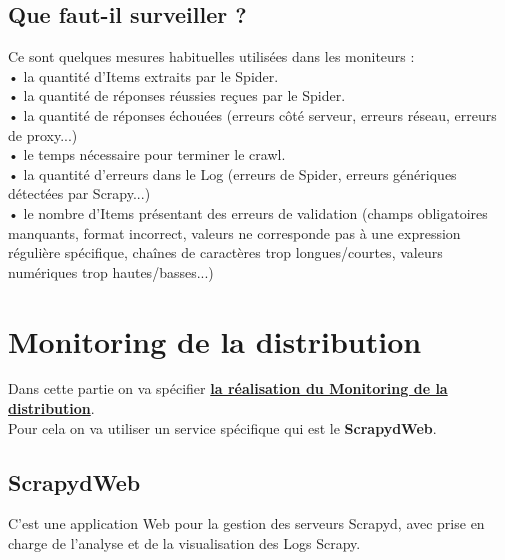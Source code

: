 \subsection{Que faut-il surveiller ?}
\noindent Ce sont quelques mesures habituelles utilisées dans les moniteurs :\\
\indent• la quantité d'Items extraits par le Spider.\\
\indent• la quantité de réponses réussies reçues par le Spider.\\
\indent• la quantité de réponses échouées (erreurs côté serveur, erreurs réseau, erreurs de proxy...)\\
\indent• le temps nécessaire pour terminer le crawl.\\
\indent• la quantité d'erreurs dans le Log (erreurs de Spider, erreurs génériques détectées par Scrapy...)\\
\indent• le nombre d'Items présentant des erreurs de validation (champs obligatoires manquants, format incorrect, valeurs ne corresponde pas à une expression régulière spécifique, chaînes de caractères trop longues/courtes, valeurs numériques trop hautes/basses...)
\section{Monitoring de la distribution}
Dans cette partie on va spécifier {\bf\underline{la réalisation du Monitoring de la distribution}}.\\
Pour cela on va utiliser un service spécifique qui est le \textbf{ScrapydWeb}.
\subsection{ScrapydWeb} 
C'est une application Web pour la gestion des serveurs Scrapyd, avec prise en charge de l'analyse et de la visualisation des Logs Scrapy.
